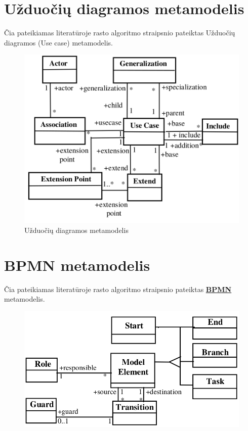 \documentclass{VUMIFInfBakalaurinis}
\newcommand{\bhyperref}[2]{\hyperref[#1]{\textbf{#2}}}
\newcommand{\BPMN}{\bhyperref{section:bpmn}{BPMN}}
\begin{document}
\section{Užduočių diagramos metamodelis} \label{appendix:lit_alg_metamodels_uc}
Čia pateikiamas literatūroje rasto algoritmo straipsnio \cite{algUseCasesFromBpmn} pateiktas Užduočių diagramos (Use case) metamodelis.
\begin{figure}[H]
    \centering
    \includegraphics[width=\textwidth]{img/appendix/literature_algorythm/use_cases_metamodel}
    \caption{Užduočių diagramos metamodelis}
\end{figure}
\section{BPMN metamodelis} \label{appendix:lit_alg_metamodels_bpmn}
Čia pateikiamas literatūroje rasto algoritmo straipsnio \cite{algUseCasesFromBpmn} pateiktas \BPMN{} metamodelis.
\begin{figure}[H]
    \centering
    \includegraphics[width=\textwidth]{img/appendix/literature_algorythm/bpmn_metamodel}
\end{figure}
\end{document}
